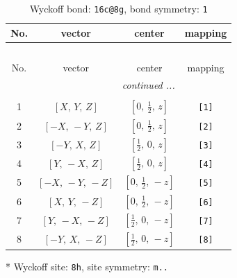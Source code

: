 \documentclass[fleqn,8pt]{jsarticle}
\begin{document}
\begin{longtable}{cccc}
\caption{Wyckoff bond: {\tt 16c@8g}, bond symmetry: {\tt 1}}
 \\
 \hline \hline
No. & vector & center & mapping \\ \hline \endfirsthead

\multicolumn{3}{l}{\tablename\ \thetable{}} \\
 \hline \hline
No. & vector & center & mapping \\ \hline \endhead

 \hline \hline
\multicolumn{3}{r}{\footnotesize\it continued ...} \\ \endfoot

 \hline \hline
\multicolumn{3}{r}{} \\ \endlastfoot

1 & $\left[ X,\, Y,\, Z \right]$ & $\left[ 0,\, \frac{1}{2},\, z \right]$ & {\tt [1]} \\ \hline
2 & $\left[ - X,\, - Y,\, Z \right]$ & $\left[ 0,\, \frac{1}{2},\, z \right]$ & {\tt [2]} \\ \hline
3 & $\left[ - Y,\, X,\, Z \right]$ & $\left[ \frac{1}{2},\, 0,\, z \right]$ & {\tt [3]} \\ \hline
4 & $\left[ Y,\, - X,\, Z \right]$ & $\left[ \frac{1}{2},\, 0,\, z \right]$ & {\tt [4]} \\ \hline
5 & $\left[ - X,\, - Y,\, - Z \right]$ & $\left[ 0,\, \frac{1}{2},\, - z \right]$ & {\tt [5]} \\ \hline
6 & $\left[ X,\, Y,\, - Z \right]$ & $\left[ 0,\, \frac{1}{2},\, - z \right]$ & {\tt [6]} \\ \hline
7 & $\left[ Y,\, - X,\, - Z \right]$ & $\left[ \frac{1}{2},\, 0,\, - z \right]$ & {\tt [7]} \\ \hline
8 & $\left[ - Y,\, X,\, - Z \right]$ & $\left[ \frac{1}{2},\, 0,\, - z \right]$ & {\tt [8]} \\
\end{longtable}
* Wyckoff site: {\tt 8h}, site symmetry: {\tt m..}
\renewcommand{\arraystretch}{1.2}
\end{document}
